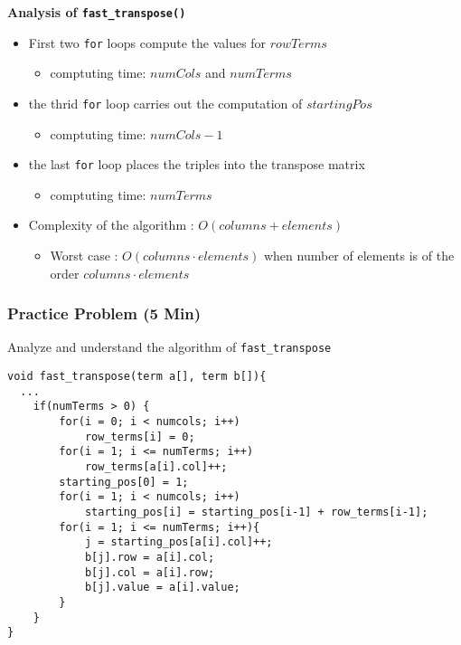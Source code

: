 \documentclass[newPxFont,sthlmFooter,nooffset]{beamer}
\begin{document}
\begin{frame}
\framebreak
\textbf{Analysis of \texttt{fast\_transpose()}}
\begin{itemize}
  \item First two \texttt{for} loops compute the values for $rowTerms$
  \begin{itemize}
    \item comptuting time: $numCols$ and $numTerms$
  \end{itemize}
  \item the thrid \texttt{for} loop carries out the computation of $startingPos$
  \begin{itemize}
    \item comptuting time: $numCols-1$
  \end{itemize}
  \item the last \texttt{for} loop places the triples into the transpose matrix
  \begin{itemize}
    \item comptuting time: $numTerms$
  \end{itemize}
  \item Complexity of the algorithm : $O(columns+elements)$
  \begin{itemize}
    \item Worst case : $O(columns \cdot elements)$ when number of elements is of the order $columns \cdot elements$
  \end{itemize}
\end{itemize}


\end{frame}

\begin{frame}[t,fragile]
	\frametitle{Practice Problem (5 Min)}
Analyze and understand the algorithm of \texttt{fast\_transpose}

\begin{lstlisting}[frame=single, lineskip = -1pt, numbers = none, numberstyle={\scriptsize}, framexleftmargin=15pt, framexrightmargin=-25pt, xleftmargin = 25pt ]
void fast_transpose(term a[], term b[]){
  ...
    if(numTerms > 0) {       
        for(i = 0; i < numcols; i++) 
            row_terms[i] = 0;   
        for(i = 1; i <= numTerms; i++)
            row_terms[a[i].col]++;
        starting_pos[0] = 1;
        for(i = 1; i < numcols; i++) 
            starting_pos[i] = starting_pos[i-1] + row_terms[i-1];
        for(i = 1; i <= numTerms; i++){ 
            j = starting_pos[a[i].col]++;
            b[j].row = a[i].col;
            b[j].col = a[i].row;
            b[j].value = a[i].value;
        }
    }
}  
\end{lstlisting}


\end{frame}
\end{document}
